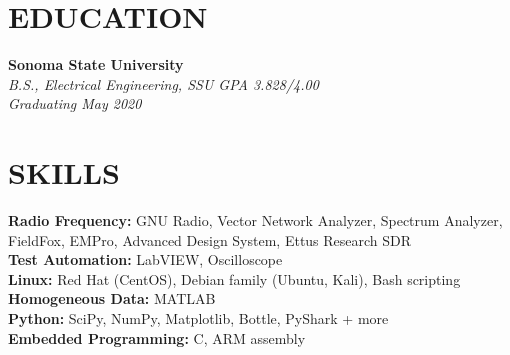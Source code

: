 \documentclass[margin,line]{resume}
\begin{document}
\begin{resume}

    \vspace{-3mm}

    \section{\mysidestyle \textbf{\large{E}\small{DUCATION}}}

    \textbf{\listing Sonoma State University} \vspace{1mm}\\
    \textsl{B.S., Electrical Engineering, SSU GPA 3.828/4.00} \\  \textsl{Graduating May 2020} \hfill \textbf{}\vspace{-3mm}\\\vspace{-1mm}%

    \vspace{-1mm}

\sectionline



    \section{\mysidestyle \textbf{\large{S}\small{KILLS}}}
    \textbf{Radio Frequency:} GNU Radio, Vector Network Analyzer, Spectrum Analyzer, FieldFox, EMPro, Advanced Design System, Ettus Research SDR\\
    \textbf{Test Automation:} LabVIEW, Oscilloscope \\
    \textbf{Linux:} Red Hat (CentOS), Debian family (Ubuntu, Kali), Bash scripting
    \\
    \textbf{Homogeneous Data:} MATLAB \\
    \textbf{Python:} SciPy, NumPy, Matplotlib, Bottle, PyShark + more \\
    \textbf{Embedded Programming:} C, ARM assembly


\sectionline


\end{resume}
\end{document}
